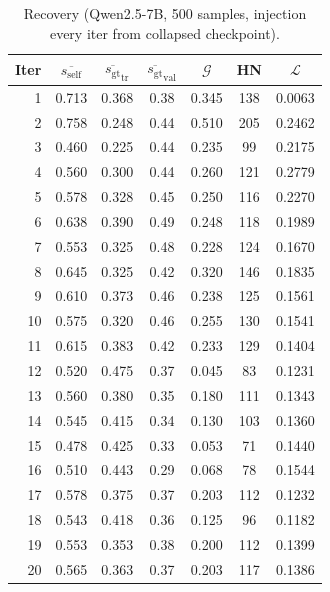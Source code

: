 \documentclass{article}
\newcommand{\gap}{\mathcal{G}}          %
\newcommand{\self}{s_{\text{self}}}     %
\newcommand{\gt}{s_{\text{gt}}}         %
\begin{document}
\begin{table}[h]
\centering
\caption{Recovery (Qwen2.5-7B, 500 samples, injection every iter from collapsed checkpoint).}
\label{tab:app-recovery}
\small
\begin{tabular}{rcccccc}
\toprule
Iter & $\overline{\self}$ & $\overline{\gt}_\text{tr}$ & $\overline{\gt}_\text{val}$ & $\gap$ & HN & $\mathcal{L}$ \\
\midrule
1  & 0.713 & 0.368 & 0.38 & 0.345 & 138 & 0.0063 \\
2  & 0.758 & 0.248 & 0.44 & 0.510 & 205 & 0.2462 \\
3  & 0.460 & 0.225 & 0.44 & 0.235 & 99  & 0.2175 \\
4  & 0.560 & 0.300 & 0.44 & 0.260 & 121 & 0.2779 \\
5  & 0.578 & 0.328 & 0.45 & 0.250 & 116 & 0.2270 \\
6  & 0.638 & 0.390 & 0.49 & 0.248 & 118 & 0.1989 \\
7  & 0.553 & 0.325 & 0.48 & 0.228 & 124 & 0.1670 \\
8  & 0.645 & 0.325 & 0.42 & 0.320 & 146 & 0.1835 \\
9  & 0.610 & 0.373 & 0.46 & 0.238 & 125 & 0.1561 \\
10 & 0.575 & 0.320 & 0.46 & 0.255 & 130 & 0.1541 \\
11 & 0.615 & 0.383 & 0.42 & 0.233 & 129 & 0.1404 \\
12 & 0.520 & 0.475 & 0.37 & 0.045 & 83  & 0.1231 \\
13 & 0.560 & 0.380 & 0.35 & 0.180 & 111 & 0.1343 \\
14 & 0.545 & 0.415 & 0.34 & 0.130 & 103 & 0.1360 \\
15 & 0.478 & 0.425 & 0.33 & 0.053 & 71  & 0.1440 \\
16 & 0.510 & 0.443 & 0.29 & 0.068 & 78  & 0.1544 \\
17 & 0.578 & 0.375 & 0.37 & 0.203 & 112 & 0.1232 \\
18 & 0.543 & 0.418 & 0.36 & 0.125 & 96  & 0.1182 \\
19 & 0.553 & 0.353 & 0.38 & 0.200 & 112 & 0.1399 \\
20 & 0.565 & 0.363 & 0.37 & 0.203 & 117 & 0.1386 \\
\bottomrule
\end{tabular}
\end{table}
\end{document}
